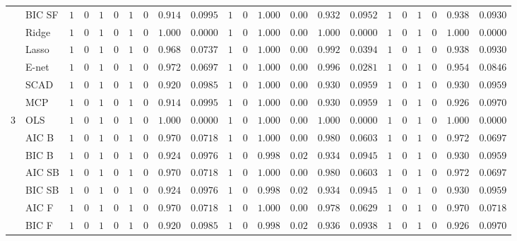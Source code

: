 \begin{tabular}{ll|ll|llllll|llllll|llllll}
 & BIC SF  & $1$ & $0$ & $1$ & $0$ & $1$ & $0$ & $0.914$ & $0.0995$ & $1$ & $0$ & $1.000$ & $0.00$ & $0.932$ & $0.0952$ & $1$ & $0$ & $1$ & $0$ & $0.938$ & $0.0930$ \\
 & Ridge  & $1$ & $0$ & $1$ & $0$ & $1$ & $0$ & $1.000$ & $0.0000$ & $1$ & $0$ & $1.000$ & $0.00$ & $1.000$ & $0.0000$ & $1$ & $0$ & $1$ & $0$ & $1.000$ & $0.0000$ \\
 & Lasso  & $1$ & $0$ & $1$ & $0$ & $1$ & $0$ & $0.968$ & $0.0737$ & $1$ & $0$ & $1.000$ & $0.00$ & $0.992$ & $0.0394$ & $1$ & $0$ & $1$ & $0$ & $0.938$ & $0.0930$ \\
 & E-net  & $1$ & $0$ & $1$ & $0$ & $1$ & $0$ & $0.972$ & $0.0697$ & $1$ & $0$ & $1.000$ & $0.00$ & $0.996$ & $0.0281$ & $1$ & $0$ & $1$ & $0$ & $0.954$ & $0.0846$ \\
 & SCAD  & $1$ & $0$ & $1$ & $0$ & $1$ & $0$ & $0.920$ & $0.0985$ & $1$ & $0$ & $1.000$ & $0.00$ & $0.930$ & $0.0959$ & $1$ & $0$ & $1$ & $0$ & $0.930$ & $0.0959$ \\
 & MCP  & $1$ & $0$ & $1$ & $0$ & $1$ & $0$ & $0.914$ & $0.0995$ & $1$ & $0$ & $1.000$ & $0.00$ & $0.930$ & $0.0959$ & $1$ & $0$ & $1$ & $0$ & $0.926$ & $0.0970$ \\\hline
3 & OLS  & $1$ & $0$ & $1$ & $0$ & $1$ & $0$ & $1.000$ & $0.0000$ & $1$ & $0$ & $1.000$ & $0.00$ & $1.000$ & $0.0000$ & $1$ & $0$ & $1$ & $0$ & $1.000$ & $0.0000$ \\
 & AIC B  & $1$ & $0$ & $1$ & $0$ & $1$ & $0$ & $0.970$ & $0.0718$ & $1$ & $0$ & $1.000$ & $0.00$ & $0.980$ & $0.0603$ & $1$ & $0$ & $1$ & $0$ & $0.972$ & $0.0697$ \\
 & BIC B  & $1$ & $0$ & $1$ & $0$ & $1$ & $0$ & $0.924$ & $0.0976$ & $1$ & $0$ & $0.998$ & $0.02$ & $0.934$ & $0.0945$ & $1$ & $0$ & $1$ & $0$ & $0.930$ & $0.0959$ \\
 & AIC SB  & $1$ & $0$ & $1$ & $0$ & $1$ & $0$ & $0.970$ & $0.0718$ & $1$ & $0$ & $1.000$ & $0.00$ & $0.980$ & $0.0603$ & $1$ & $0$ & $1$ & $0$ & $0.972$ & $0.0697$ \\
 & BIC SB  & $1$ & $0$ & $1$ & $0$ & $1$ & $0$ & $0.924$ & $0.0976$ & $1$ & $0$ & $0.998$ & $0.02$ & $0.934$ & $0.0945$ & $1$ & $0$ & $1$ & $0$ & $0.930$ & $0.0959$ \\
 & AIC F  & $1$ & $0$ & $1$ & $0$ & $1$ & $0$ & $0.970$ & $0.0718$ & $1$ & $0$ & $1.000$ & $0.00$ & $0.978$ & $0.0629$ & $1$ & $0$ & $1$ & $0$ & $0.970$ & $0.0718$ \\
 & BIC F  & $1$ & $0$ & $1$ & $0$ & $1$ & $0$ & $0.920$ & $0.0985$ & $1$ & $0$ & $0.998$ & $0.02$ & $0.936$ & $0.0938$ & $1$ & $0$ & $1$ & $0$ & $0.926$ & $0.0970$ \\

\end{tabular}
